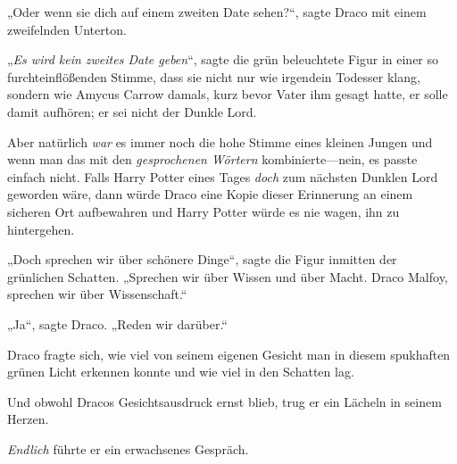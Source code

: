 „Oder wenn sie dich auf einem zweiten Date sehen?“, sagte Draco mit einem zweifelnden Unterton.

„\emph{Es wird kein zweites Date geben}“, sagte die grün beleuchtete Figur in einer so furchteinflößenden Stimme, dass sie nicht nur wie irgendein Todesser klang, sondern wie Amycus Carrow damals, kurz bevor Vater ihm gesagt hatte, er solle damit aufhören; er sei nicht der Dunkle Lord.

Aber natürlich \emph{war} es immer noch die hohe Stimme eines kleinen Jungen und wenn man das mit den \emph{gesprochenen Wörtern} kombinierte—nein, es passte einfach nicht. Falls Harry Potter eines Tages \emph{doch} zum nächsten Dunklen Lord geworden wäre, dann würde Draco eine Kopie dieser Erinnerung an einem sicheren Ort aufbewahren und Harry Potter würde es nie wagen, ihn zu hintergehen.

„Doch sprechen wir über schönere Dinge“, sagte die Figur inmitten der grünlichen Schatten. „Sprechen wir über Wissen und über Macht. Draco Malfoy, sprechen wir über Wissenschaft.“

„Ja“, sagte Draco. „Reden wir darüber.“

Draco fragte sich, wie viel von seinem eigenen Gesicht man in diesem spukhaften grünen Licht erkennen konnte und wie viel in den Schatten lag.

Und obwohl Dracos Gesichtsausdruck ernst blieb, trug er ein Lächeln in seinem Herzen.

\emph{Endlich} führte er ein erwachsenes Gespräch.


